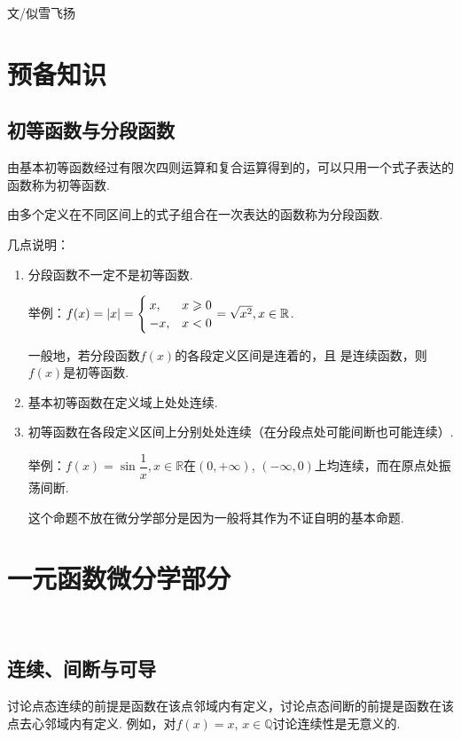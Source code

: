 \begin{flushright}
文/似雪飞扬
\end{flushright}

\section{预备知识}
  \subsection*{初等函数与分段函数}
    \begin{defn}
      由基本初等函数经过有限次四则运算和复合运算得到的，可以只用一个式子表达的函数称为初等函数.
    \end{defn}
    \begin{defn}
      由多个定义在不同区间上的式子组合在一次表达的函数称为分段函数.
    \end{defn}
    几点说明：
    \begin{enumerate}[label=(\arabic*)]
      \item 分段函数不一定不是初等函数.

      举例：$f(x) = \left| x \right| =
      \begin{cases}
        x, & x \geqslant 0 \\
        -x, & x < 0
      \end{cases}
      = \sqrt{x^2}, x \in \mathbb{R}$.

      一般地，若分段函数$f(x)$的各段定义区间是连着的，且 是连续函数，则$f(x)$是初等函数.
      \item 基本初等函数在定义域上处处连续.
      \item 初等函数在各段定义区间上分别处处连续（在分段点处可能间断也可能连续）.

      举例：$f(x) =\sin \dfrac{1}{x}, x \in \mathbb{R}$在$(0,+\infty)$, $(-\infty,0)$上均连续，而在原点处振荡间断.

      这个命题不放在微分学部分是因为一般将其作为不证自明的基本命题.
    \end{enumerate}

\section{一元函数微分学部分}
~ \subsection{连续、间断与可导}
    \hspace*{2em}讨论点态连续的前提是函数在该点邻域内有定义，讨论点态间断的前提是函数在该点去心邻域内有定义. 例如，对$f\left( x \right) =x$, $x\in \mathbb{Q}$讨论连续性是无意义的.

